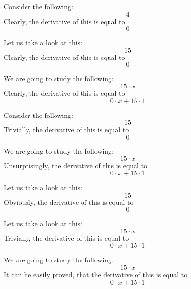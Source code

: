 \documentclass{article}
\begin{document}
Consider the following:
\begin{equation}
4 
\end{equation}
Clearly, the derivative of this is equal to
\begin{equation}
0 
\end{equation}

Let us take a look at this:
\begin{equation}
15 
\end{equation}
Clearly, the derivative of this is equal to
\begin{equation}
0 
\end{equation}

We are going to study the following:
\begin{equation}
15 \cdot x 
\end{equation}
Clearly, the derivative of this is equal to
\begin{equation}
0 \cdot x + 15 \cdot 1 
\end{equation}

Consider the following:
\begin{equation}
15 
\end{equation}
Trivially, the derivative of this is equal to
\begin{equation}
0 
\end{equation}

We are going to study the following:
\begin{equation}
15 \cdot x 
\end{equation}
Unsurprisingly, the derivative of this is equal to
\begin{equation}
0 \cdot x + 15 \cdot 1 
\end{equation}

Let us take a look at this:
\begin{equation}
15 
\end{equation}
Obviously, the derivative of this is equal to
\begin{equation}
0 
\end{equation}

Let us take a look at this:
\begin{equation}
15 \cdot x 
\end{equation}
Trivially, the derivative of this is equal to
\begin{equation}
0 \cdot x + 15 \cdot 1 
\end{equation}

We are going to study the following:
\begin{equation}
15 \cdot x 
\end{equation}
It can be easily proved, that the derivative of this is equal to
\begin{equation}
0 \cdot x + 15 \cdot 1 
\end{equation}
\end{document}
